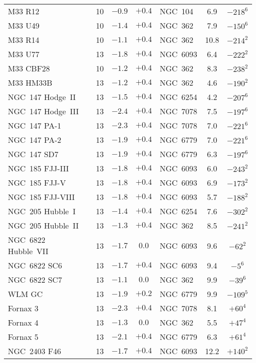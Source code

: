 \documentclass{aa}
\begin{document}
\begin{table*}
{\begin{tabular}{lccclcc}
M33 R12 & 10 & $-0.9$ & $+0.4$ & NGC~104 & 6.9 & $-218^6$ \\
M33 U49 & 10 & $-1.4$ & $+0.4$ & NGC~362 & 7.9 & $-150^6$ \\
M33 R14 & 10 & $-1.1$ & $+0.4$ & NGC~362 & 10.8 & $-214^2$ \\
M33 U77 & 13 & $-1.8$ & $+0.4$ & NGC~6093 & 6.4 & $-222^2$ \\
M33 CBF28 & 10 & $-1.2$ & $+0.4$ & NGC~362 & 8.3 & $-238^2$ \\
M33 HM33B & 13 & $-1.2$ & $+0.4$ & NGC~362 & 4.6 & $-190^2$ \\
NGC~147 Hodge~II & 13 & $-1.5$ & $+0.4$ & NGC~6254 & 4.2 & $-207^6$ \\
NGC~147 Hodge~III & 13 & $-2.4$ & $+0.4$ & NGC~7078 & 7.5 & $-197^6$ \\
NGC~147 PA-1 & 13 & $-2.3$ & $+0.4$ & NGC~7078 & 7.0 & $-221^6$ \\
NGC~147 PA-2 & 13 & $-1.9$ & $+0.4$ & NGC~6779 & 7.0 & $-221^6$ \\
NGC~147 SD7  & 13 & $-1.9$ & $+0.4$ & NGC~6779 & 6.3 & $-197^6$ \\
NGC~185 FJJ-III & 13 & $-1.8$ & $+0.4$ & NGC~6093 & 6.0 & $-243^2$ \\
NGC~185 FJJ-V & 13 & $-1.8$ & $+0.4$ & NGC~6093 & 6.9 & $-173^2$ \\
NGC~185 FJJ-VIII & 13 & $-1.8$ & $+0.4$ & NGC~6093 & 5.7 & $-188^2$ \\
NGC~205 Hubble~I & 13 & $-1.4$ & $+0.4$ & NGC~6254 & 7.6 & $-302^2$ \\
NGC~205 Hubble~II & 13 & $-1.3$ & $+0.4$ & NGC~362 & 8.5 & $-241^2$ \\
NGC~6822 Hubble~VII & 13 & $-1.7$ & $0.0$ & NGC~6093 & 9.6 & $-62^2$ \\
NGC~6822 SC6 & 13 & $-1.7$ & $+0.4$ & NGC~6093 & 9.4 & $-5^6$ \\
NGC~6822 SC7 & 13 & $-1.1$ & $0.0$ & NGC~362 & 9.9 & $-39^6$ \\
WLM GC & 13 & $-1.9$ & $+0.2$ & NGC~6779 & 9.9 & $-109^5$ \\
Fornax 3 & 13 & $-2.3$ & $+0.4$ & NGC~7078 & 8.1 & $+60^4$ \\
Fornax 4 & 13 & $-1.3$ & $0.0$ & NGC~362 & 5.5 & $+47^4$ \\
Fornax 5 & 13 & $-2.1$ & $+0.4$ & NGC~6779 & 6.3 & $+61^4$ \\
NGC~2403 F46 & 13 & $-1.7$ & $+0.4$ & NGC~6093 & 12.2 & $+140^2$ \\
\hline
\end{tabular}
}
\end{table*}
\end{document}
